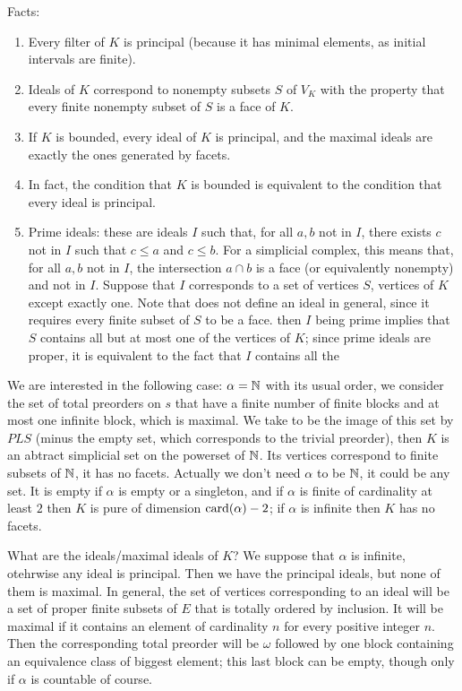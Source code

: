 Facts:
\begin{enumerate}
\item Every filter of $K$ is principal (because it has minimal elements, as initial intervals are finite).
\item Ideals of $K$ correspond to nonempty subsets $S$ of $V_K$ with the property that every finite nonempty subset of $S$ is a face of $K$.
\item If $K$ is bounded, every ideal of $K$ is principal, and the maximal ideals are exactly the ones generated by facets.
\item In fact, the condition that $K$ is bounded is equivalent to the condition that every ideal is principal.
\item Prime ideals: these are ideals $I$ such that, for all $a,b$ not in $I$, there exists $c$ not in $I$ such that $c\leq a$ and $c\leq b$. For a simplicial complex,
this means that, for all $a,b$ not in $I$, the intersection $a\cap b$ is a face (or equivalently nonempty) and not in $I$. Suppose that $I$ corresponds to a set of vertices $S$,
vertices of $K$ except exactly one. Note that does not define an ideal in general, since it requires every finite subset of $S$ to be a face.
then $I$ being prime implies that $S$ contains all but at most one of the vertices of $K$; since prime ideals are proper, it is equivalent to the fact that $I$ contains all the

\end{enumerate}

We are interested in the following case: $\alpha=\mathbb{N}$ with its usual order, we consider the set of total preorders on $s$ that have a finite number of finite blocks and at most one infinite block, 
which is maximal. We take to be the image of this set by $PLS$ (minus the empty set, which corresponds to the trivial preorder), then $K$ is an abtract simplicial set on the powerset of $\mathbb{N}$.
Its vertices correspond to finite subsets of $\mathbb{N}$, it has no facets. Actually we don't need $\alpha$ to be $\mathbb{N}$, it could be any set. It is empty if $\alpha$ is empty or a singleton, and if $\alpha$
is finite of cardinality at least $2$ then $K$ is pure of dimension $\operatorname{card}(\alpha)-2$; if $\alpha$ is infinite then $K$ has no facets.

What are the ideals/maximal ideals of $K$? We suppose that $\alpha$ is infinite, otehrwise any ideal is principal. Then we have the principal ideals, but none of them is maximal. In general, the set
of vertices corresponding to an ideal will be a set of proper finite subsets of $E$ that is totally ordered by inclusion. It will be maximal if it contains an element of cardinality $n$ for every
positive integer $n$. Then the corresponding total preorder will be $\omega$ followed by one block containing an equivalence class of biggest element; this last block can be empty, though only if 
$\alpha$ is countable of course. 

